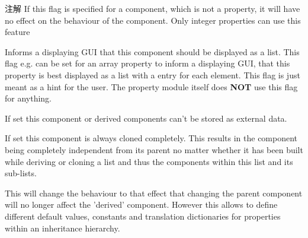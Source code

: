 \begin{Desc}
\begin{description}
\begin{DoxyNote}{注解}
If this flag is specified for a component, which is not a property, it will have no effect on the behaviour of the component. Only integer properties can use this feature 
\end{DoxyNote}
\item[{\em 
\hypertarget{group___common_interface_gga4ef1be7cf1ca9dd256fd3060dd0787bba9ea6fc98aee76df76c6f779dab38cad1}{cf\+Should\+Be\+Displayed\+As\+List}\label{group___common_interface_gga4ef1be7cf1ca9dd256fd3060dd0787bba9ea6fc98aee76df76c6f779dab38cad1}
}]Informs a displaying G\+U\+I that this component should be displayed as a list. This flag e.\+g. can be set for an array property to inform a displaying G\+U\+I, that this property is best displayed as a list with a entry for each element. This flag is just meant as a hint for the user. The property module itself does {\bfseries N\+O\+T} use this flag for anything. \item[{\em 
\hypertarget{group___common_interface_gga4ef1be7cf1ca9dd256fd3060dd0787bbacf1a70c8a46a98ea6c3e8b6d240e4a13}{cf\+Disallow\+Serialize}\label{group___common_interface_gga4ef1be7cf1ca9dd256fd3060dd0787bbacf1a70c8a46a98ea6c3e8b6d240e4a13}
}]If set this component or derived components can't be stored as external data. \item[{\em 
\hypertarget{group___common_interface_gga4ef1be7cf1ca9dd256fd3060dd0787bba6f36879a221e12d9db5ef366d6f09368}{cf\+Always\+Force\+Clone}\label{group___common_interface_gga4ef1be7cf1ca9dd256fd3060dd0787bba6f36879a221e12d9db5ef366d6f09368}
}]If set this component is always cloned completely. This results in the component being completely independent from its parent no matter whether it has been built while deriving or cloning a list and thus the components within this list and its sub-\/lists.

This will change the behaviour to that effect that changing the parent component will no longer affect the 'derived' component. However this allows to define different default values, constants and translation dictionaries for properties within an inheritance hierarchy.


\end{description}
\end{Desc}
